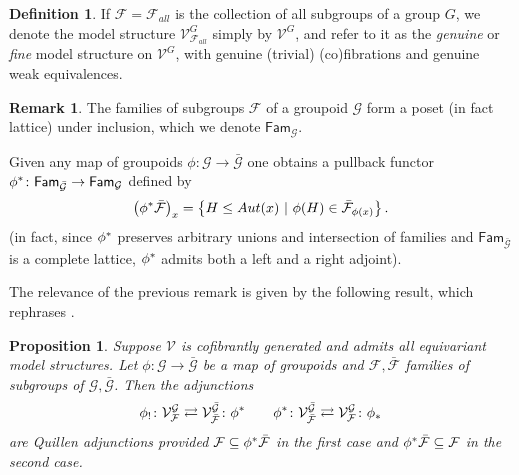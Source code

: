 \documentclass[a4paper,10pt
,draft
]{article}%
\numberwithin{equation}{section}
\numberwithin{figure}{section}
\newtheorem{proposition}[equation]{Proposition}%
\theoremstyle{definition} %
\newtheorem{definition}[equation]{Definition}%
\newtheorem{remark}[equation]{Remark}%
\newcommand{\F}{\ensuremath{\mathcal F}}
\newcommand{\V}{\ensuremath{\mathcal V}}
\newcommand{\G}{\ensuremath{\mathcal G}}
\newcommand{\1}{\ensuremath{\mathbbm 1}}%
\begin{document}
\begin{definition}\label{GENMOD DEF}
If $\F = \F_{all}$ is the collection of all subgroups of a group $G$, we denote the model structure $\V^{G}_{\F_{all}}$ simply by $\V^G$,
and refer to it as the \textit{genuine} or \textit{fine} model structure on $\V^G$,
with genuine (trivial) (co)fibrations and genuine weak equivalences.
\end{definition}


\begin{remark}
The families of subgroups $\F$ of a groupoid $\G$ 
form a poset (in fact lattice) under inclusion,
which we denote $\mathsf{Fam}_{\G}$. 

Given any map of groupoids $\phi\colon \G \to \bar{\G}$
one obtains a pullback functor
$\phi^{\**} \colon \mathsf{Fam}_{\bar{\G}} \to \mathsf{Fam}_{\G}$
defined by
\begin{equation}
      \label{PHISTAR_EQ}
      \left(\phi^{\**} \bar{\F} \right)_{x}
      =
      \left\{H \leq Aut(x) \ | \ \phi(H) \in \bar{\F}_{\phi(x)}\right\}.
\end{equation}
(in fact, since $\phi^{\**}$ preserves arbitrary unions and intersection of families and 
$\mathsf{Fam}_{\bar{\G}}$
is a complete lattice, $\phi^{\**}$ admits both a left and a right adjoint).
\end{remark}

The relevance of the previous remark is given by the following result,
which rephrases \cite[Props. 6.6, 6.7]{BP_geo}.


\begin{proposition}\label{EQQUILADJ PROP}
Suppose $\V$ is cofibrantly generated and admits all equivariant model structures.
Let $\phi \colon \G \to \bar{\G}$
be a map of groupoids and
$\F,\bar{\F}$ families of subgroups of $\G,\bar{\G}$.
Then the adjunctions
\[
	\phi_! \colon \V^{\G}_{\F}
	\rightleftarrows
	\V^{\bar{\G}}_{\bar{\F}} \colon \phi^{\**}
\qquad
	\phi^{\**} \colon \V^{\bar{\G}}_{\bar{\F}} 
	\rightleftarrows
	\V^{\G}_{\F} \colon \phi_{\**}
\]
are Quillen adjunctions provided
$\F \subseteq \phi^{\**} \bar{\F}$
in the first case and 
$\phi^{\**} \bar{\F} \subseteq \F$
in the second case.
\end{proposition}
\end{document}
